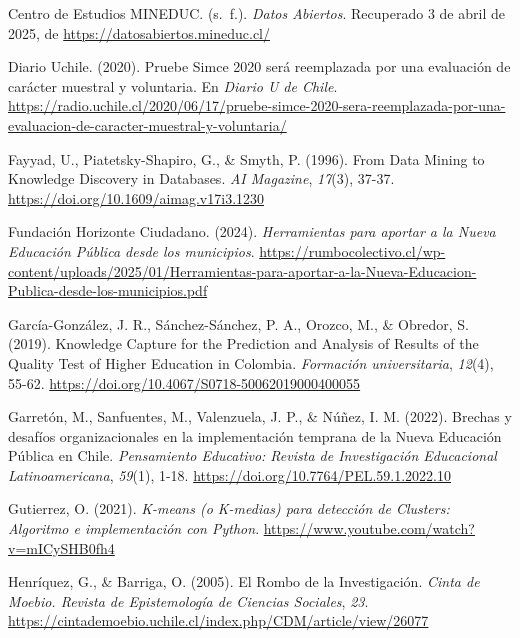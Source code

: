 \documentclass[
  12pt,
  letterpaper,
]{article}
\newlength{\cslhangindent}
\newenvironment{CSLReferences}[2] %
 {\begin{list}{}{%
  \setlength{\itemindent}{0pt}
  \setlength{\leftmargin}{0pt}
  \setlength{\parsep}{0pt}
  \ifodd #1
   \setlength{\leftmargin}{\cslhangindent}
   \setlength{\itemindent}{-1\cslhangindent}
  \fi
  \setlength{\itemsep}{#2\baselineskip}}}
 {\end{list}}
\begin{document}
\begin{CSLReferences}{1}{0}
Centro de Estudios MINEDUC. (s.~f.). \emph{Datos {Abiertos}}. Recuperado 3 de abril de 2025, de \url{https://datosabiertos.mineduc.cl/}

Diario Uchile. (2020). Pruebe {Simce} 2020 será reemplazada por una evaluación de carácter muestral y voluntaria. En \emph{Diario U de Chile}. \url{https://radio.uchile.cl/2020/06/17/pruebe-simce-2020-sera-reemplazada-por-una-evaluacion-de-caracter-muestral-y-voluntaria/}

Fayyad, U., Piatetsky-Shapiro, G., \& Smyth, P. (1996). From {Data} {Mining} to {Knowledge} {Discovery} in {Databases}. \emph{AI Magazine}, \emph{17}(3), 37-37. \url{https://doi.org/10.1609/aimag.v17i3.1230}

Fundación Horizonte Ciudadano. (2024). \emph{Herramientas para aportar a la {Nueva} {Educación} {Pública} desde los municipios}. \url{https://rumbocolectivo.cl/wp-content/uploads/2025/01/Herramientas-para-aportar-a-la-Nueva-Educacion-Publica-desde-los-municipios.pdf}

García-González, J. R., Sánchez-Sánchez, P. A., Orozco, M., \& Obredor, S. (2019). Knowledge {Capture} for the {Prediction} and {Analysis} of {Results} of the {Quality} {Test} of {Higher} {Education} in {Colombia}. \emph{Formación universitaria}, \emph{12}(4), 55-62. \url{https://doi.org/10.4067/S0718-50062019000400055}

Garretón, M., Sanfuentes, M., Valenzuela, J. P., \& Núñez, I. M. (2022). Brechas y desafíos organizacionales en la implementación temprana de la {Nueva} {Educación} {Pública} en {Chile}. \emph{Pensamiento Educativo: Revista de Investigación Educacional Latinoamericana}, \emph{59}(1), 1-18. \url{https://doi.org/10.7764/PEL.59.1.2022.10}

Gutierrez, O. (2021). \emph{K-means (o {K}-medias) para detección de {Clusters}: {Algoritmo} e implementación con {Python}}. \url{https://www.youtube.com/watch?v=mICySHB0fh4}

Henríquez, G., \& Barriga, O. (2005). El {Rombo} de la {Investigación}. \emph{Cinta de Moebio. Revista de Epistemología de Ciencias Sociales}, \emph{23}. \url{https://cintademoebio.uchile.cl/index.php/CDM/article/view/26077}


\end{CSLReferences}
\end{document}
